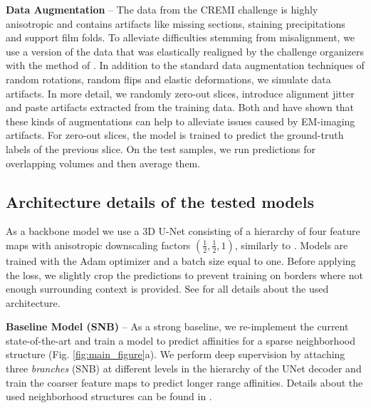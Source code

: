 \textbf{Data Augmentation} -- The data from the CREMI challenge is highly \linebreak anisotropic and contains artifacts like missing sections, staining precipitations and support film folds. 
To alleviate difficulties stemming from misalignment, we use a version of the data that was elastically realigned by the challenge organizers with the method of \cite{saalfeld2012elastic}.
In addition to the standard data augmentation techniques of random rotations, random flips and  elastic deformations, we simulate data artifacts.
In more detail, we randomly zero-out slices, introduce alignment jitter and paste artifacts extracted from the training data. Both \cite{funke2018large} and \cite{lee2017superhuman} have shown
that these kinds of augmentations can help to alleviate issues caused by EM-imaging artifacts. For zero-out slices, the model is trained to predict the ground-truth labels of the previous slice.
On the test samples, we run predictions for overlapping volumes and then average them.


 
 


\subsection{Architecture details of the tested models}
As a backbone model we use a 3D U-Net consisting of a hierarchy of four feature maps with anisotropic downscaling factors $(\frac{1}{2},\frac{1}{2},1)$, similarly to \cite{lee2019learning,lee2017superhuman,wolf2018mutex}. 
Models are trained with the Adam optimizer and a batch size equal to one. Before applying the loss, we slightly crop the predictions to prevent training on borders where not enough surrounding context is provided. 
See  for all details about the used architecture. 

 
\textbf{Baseline Model (SNB)} -- As a strong baseline, we re-implement the current state-of-the-art and train a model to predict affinities for a sparse neighborhood structure (Fig. \ref{fig:main_figure}a). We perform deep supervision by attaching three \emph{\sparseBr branches} (SNB) at different levels in the hierarchy of the UNet decoder and train the coarser feature maps to predict longer range affinities. Details about the used neighborhood structures can be found in .

